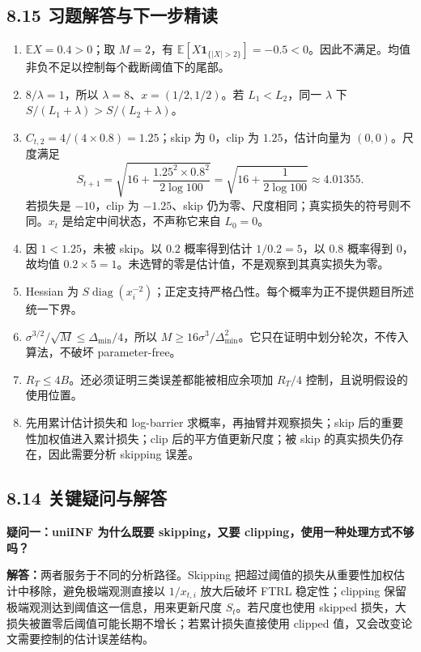 \subsection{8.15 习题解答与下一步精读}
\begin{enumerate}
\item $\mathbb EX=0.4>0$；取 $M=2$，有 $\mathbb E[X\mathbf1_{\{|X|>2\}}]=-0.5<0$。因此不满足。均值非负不足以控制每个截断阈值下的尾部。
\item $8/\lambda=1$，所以 $\lambda=8$、$x=(1/2,1/2)$。若 $L_1<L_2$，同一 $\lambda$ 下 $S/(L_1+\lambda)>S/(L_2+\lambda)$。
\item $C_{t,2}=4/(4\times0.8)=1.25$；skip 为 $0$，clip 为 $1.25$，估计向量为 $(0,0)$。尺度满足
\[
S_{t+1}=\sqrt{16+\frac{1.25^2\times0.8^2}{2\log100}}
=\sqrt{16+\frac1{2\log100}}\approx4.01355.
\]
若损失是 $-10$，clip 为 $-1.25$、skip 仍为零、尺度相同；真实损失的符号则不同。$x_t$ 是给定中间状态，不声称它来自 $L_0=0$。
\item 因 $1<1.25$，未被 skip。以 $0.2$ 概率得到估计 $1/0.2=5$，以 $0.8$ 概率得到 $0$，故均值 $0.2\times5=1$。未选臂的零是估计值，不是观察到其真实损失为零。
\item Hessian 为 $S\operatorname{diag}(x_i^{-2})$；正定支持严格凸性。每个概率为正不提供题目所述统一下界。
\item $\sigma^{3/2}/\sqrt M\le\Delta_{\min}/4$，所以 $M\ge16\sigma^3/\Delta_{\min}^2$。它只在证明中划分轮次，不传入算法，不破坏 parameter-free。
\item $R_T\le4B$。还必须证明三类误差都能被相应余项加 $R_T/4$ 控制，且说明假设的使用位置。
\item 先用累计估计损失和 log-barrier 求概率，再抽臂并观察损失；skip 后的重要性加权值进入累计损失；clip 后的平方值更新尺度；被 skip 的真实损失仍存在，因此需要分析 skipping 误差。
\end{enumerate}

\fi
\subsection{8.14 关键疑问与解答}

\textbf{疑问一：uniINF 为什么既要 skipping，又要 clipping，使用一种处理方式不够吗？}

\textbf{解答：}两者服务于不同的分析路径。Skipping 把超过阈值的损失从重要性加权估计中移除，避免极端观测直接以 $1/x_{t,i}$ 放大后破坏 FTRL 稳定性；clipping 保留极端观测达到阈值这一信息，用来更新尺度 $S_t$。若尺度也使用 skipped 损失，大损失被置零后阈值可能长期不增长；若累计损失直接使用 clipped 值，又会改变论文需要控制的估计误差结构。

